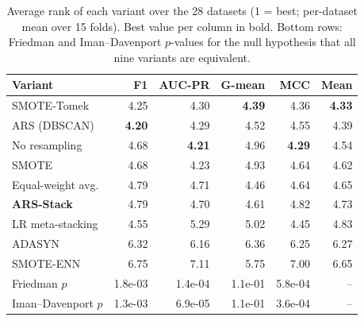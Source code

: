 \begin{table}[t]\centering
\caption{Average rank of each variant over the 28 datasets (1 = best; per-dataset mean over 15 folds). Best value per column in bold. Bottom rows: Friedman and Iman--Davenport $p$-values for the null hypothesis that all nine variants are equivalent.}
\label{tab:ranks}
\begin{tabular}{lrrrrr}
\toprule
Variant & F1 & AUC-PR & G-mean & MCC & Mean \\
\midrule
SMOTE-Tomek & 4.25 & 4.30 & \textbf{4.39} & 4.36 & \textbf{4.33} \\
ARS (DBSCAN) & \textbf{4.20} & 4.29 & 4.52 & 4.55 & 4.39 \\
No resampling & 4.68 & \textbf{4.21} & 4.96 & \textbf{4.29} & 4.54 \\
SMOTE & 4.68 & 4.23 & 4.93 & 4.64 & 4.62 \\
Equal-weight avg. & 4.79 & 4.71 & 4.46 & 4.64 & 4.65 \\
\textbf{ARS-Stack} & 4.79 & 4.70 & 4.61 & 4.82 & 4.73 \\
LR meta-stacking & 4.55 & 5.29 & 5.02 & 4.45 & 4.83 \\
ADASYN & 6.32 & 6.16 & 6.36 & 6.25 & 6.27 \\
SMOTE-ENN & 6.75 & 7.11 & 5.75 & 7.00 & 6.65 \\
\midrule
Friedman $p$ & 1.8e-03 & 1.4e-04 & 1.1e-01 & 5.8e-04 & -- \\
Iman--Davenport $p$ & 1.3e-03 & 6.9e-05 & 1.1e-01 & 3.6e-04 & -- \\
\bottomrule
\end{tabular}
\end{table}